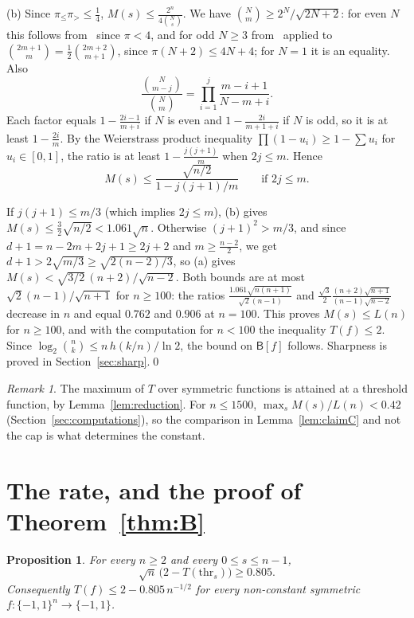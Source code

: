 \documentclass[11pt]{amsart}
\newtheorem{proposition}[lemma]{Proposition}
\theoremstyle{remark}
\newtheorem{remark}[lemma]{Remark}
\newcommand{\bits}{\{-1,1\}}
\newcommand{\thr}{\mathrm{thr}}
\begin{document}
(b) Since $\pi_\le\pi_>\le\frac14$, $M(s)\le\frac{2^n}{4\binom Ns}$. We have $\binom Nm\ge2^N/\sqrt{2N+2}$: for even $N$ this follows from~\cite{Kaz56} since $\pi<4$, and for odd $N\ge3$ from~\cite{Kaz56} applied to $\binom{2m+1}m=\frac12\binom{2m+2}{m+1}$, since $\pi(N+2)\le4N+4$; for $N=1$ it is an equality. Also
\[
 \frac{\binom N{m-j}}{\binom Nm}=\prod_{i=1}^j\frac{m-i+1}{N-m+i}.
\]
Each factor equals $1-\frac{2i-1}{m+i}$ if $N$ is even and $1-\frac{2i}{m+1+i}$ if $N$ is odd, so it is at least $1-\frac{2i}m$. By the Weierstrass product inequality $\prod(1-u_i)\ge1-\sum u_i$ for $u_i\in[0,1]$, the ratio is at least $1-\frac{j(j+1)}m$ when $2j\le m$. Hence
\[
 M(s)\le\frac{\sqrt{n/2}}{1-j(j+1)/m}\qquad\text{if }2j\le m.
\]

If $j(j+1)\le m/3$ (which implies $2j\le m$), (b) gives $M(s)\le\frac32\sqrt{n/2}<1.061\sqrt n$. Otherwise $(j+1)^2>m/3$, and since $d+1=n-2m+2j+1\ge2j+2$ and $m\ge\frac{n-2}2$, we get $d+1>2\sqrt{m/3}\ge\sqrt{2(n-2)/3}$, so (a) gives $M(s)<\sqrt{3/2}\,(n+2)/\sqrt{n-2}$. Both bounds are at most $\sqrt2(n-1)/\sqrt{n+1}$ for $n\ge100$: the ratios $\frac{1.061\sqrt{n(n+1)}}{\sqrt2(n-1)}$ and $\frac{\sqrt3}{2}\frac{(n+2)\sqrt{n+1}}{(n-1)\sqrt{n-2}}$ decrease in $n$ and equal $0.762$ and $0.906$ at $n=100$. This proves $M(s)\le L(n)$ for $n\ge100$, and with the computation for $n<100$ the inequality $T(f)\le2$. Since $\log_2\binom nk\le n\,h(k/n)/\ln2$, the bound on $\mathsf B[f]$ follows. Sharpness is proved in Section~\ref{sec:sharp}.\qed

\begin{remark}
The maximum of $T$ over symmetric functions is attained at a threshold function, by Lemma~\ref{lem:reduction}. For $n\le1500$, $\max_sM(s)/L(n)<0.42$ (Section~\ref{sec:computations}), so the comparison in Lemma~\ref{lem:claimC} and not the cap is what determines the constant.
\end{remark}

\section{The rate, and the proof of Theorem~\ref{thm:B}}\label{sec:B}

\begin{proposition}\label{prop:Q}
For every $n\ge2$ and every $0\le s\le n-1$,
\[
 \sqrt n\,\bigl(2-T(\thr_s)\bigr)\ge0.805.
\]
Consequently $T(f)\le2-0.805\,n^{-1/2}$ for every non-constant symmetric $f:\bits^n\to\bits$.
\end{proposition}
\end{document}
